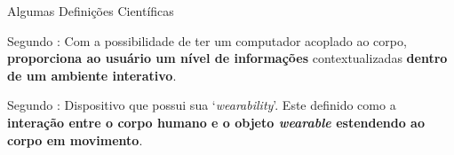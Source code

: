       
      \begin{frame} {\Wearables}{Algumas Definições Científicas} \vspace{-1em}
         \begin{block}{Segundo \cite{Amorim2017}:} 
            Com a possibilidade de ter um computador acoplado ao corpo, \textbf{proporciona ao usuário um nível de informações} contextualizadas \textbf{dentro de um ambiente interativo}.
         \end{block}
            
            \bigskip
      
         \begin{block}{Segundo \cite{Gemperle1998}:} 
            Dispositivo que possui sua `\textit{wearability}'. Este definido como a \textbf{interação entre o corpo humano e o objeto \textit{wearable} estendendo ao corpo em movimento}.
         \end{block}
      
      \end{frame}
   
